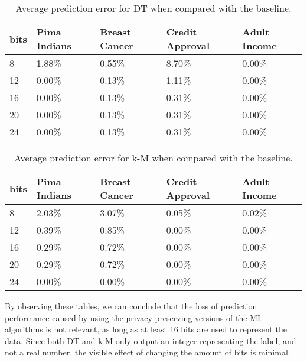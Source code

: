 \begin{table}[H]
\centering
\caption{Average prediction error for \ac{DT} when compared with the baseline.}
\label{table:avgErrorDT}
\begin{tabular}{|l|l|l|l|l|}
\hline
bits & Pima Indians & Breast Cancer & Credit Approval & Adult Income \\ \hline
8    & 1.88\%       & 0.55\%        & 8.70\%          & 0.00\%       \\ \hline
12   & 0.00\%       & 0.13\%        & 1.11\%          & 0.00\%       \\ \hline
16   & 0.00\%       & 0.13\%        & 0.31\%          & 0.00\%       \\ \hline
20   & 0.00\%       & 0.13\%        & 0.31\%          & 0.00\%       \\ \hline
24   & 0.00\%       & 0.13\%        & 0.31\%          & 0.00\%       \\ \hline
\end{tabular}
\end{table}

\begin{table}[H]
\centering
\caption{Average prediction error for \ac{k-M} when compared with the baseline.}
\label{table:avgErrorKM}
\begin{tabular}{|l|l|l|l|l|}
\hline
bits & Pima Indians & Breast Cancer & Credit Approval & Adult Income \\ \hline
8    & 2.03\%       & 3.07\%        &    0.05\%       &     0.02\%   \\ \hline
12   & 0.39\%       & 0.85\%        &    0.00\%       &     0.00\%   \\ \hline
16   & 0.29\%       & 0.72\%        &    0.00\%       &     0.00\%   \\ \hline
20   & 0.29\%       & 0.72\%        &    0.00\%       &     0.00\%   \\ \hline
24   & 0.00\%       & 0.00\%        &    0.00\%       &     0.00\%   \\ \hline
\end{tabular}
\end{table}

By observing these tables, we can conclude that the loss of prediction performance caused by using the privacy-preserving versions of the \ac{ML} algorithms is not relevant, as long as at least 16 bits are used to represent the data. Since both \ac{DT} and \ac{k-M} only output an integer representing the label, and not a real number, the visible effect of changing the amount of bits is minimal.



